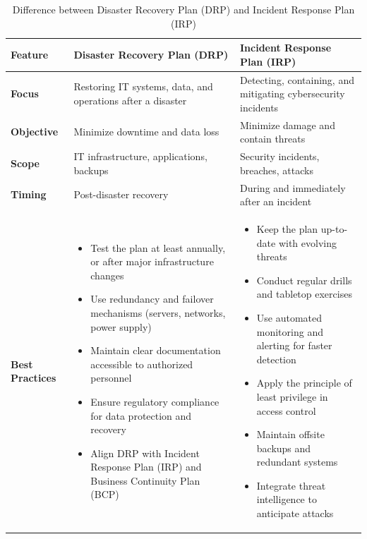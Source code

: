 \begin{table}[h!]
\centering
\renewcommand{\arraystretch}{1.35}
\begin{tabular}{|p{3cm}|p{6.2cm}|p{6.2cm}|}
\hline
\textbf{Feature} & \textbf{Disaster Recovery Plan (DRP)} & \textbf{Incident Response Plan (IRP)} \\
\hline

\textbf{Focus} & Restoring IT systems, data, and operations after a disaster &
Detecting, containing, and mitigating cybersecurity incidents \\
\hline

\textbf{Objective} & Minimize downtime and data loss &
Minimize damage and contain threats \\
\hline

\textbf{Scope} & IT infrastructure, applications, backups &
Security incidents, breaches, attacks \\
\hline

\textbf{Timing} & Post-disaster recovery &
During and immediately after an incident \\
\hline

\textbf{Best Practices} &
\begin{itemize}
    \item Test the plan at least annually, or after major infrastructure changes
    \item Use redundancy and failover mechanisms (servers, networks, power supply)
    \item Maintain clear documentation accessible to authorized personnel
    \item Ensure regulatory compliance for data protection and recovery
    \item Align DRP with Incident Response Plan (IRP) and Business Continuity Plan (BCP)
\end{itemize}
&
\begin{itemize}
    \item Keep the plan up-to-date with evolving threats
    \item Conduct regular drills and tabletop exercises
    \item Use automated monitoring and alerting for faster detection
    \item Apply the principle of least privilege in access control
    \item Maintain offsite backups and redundant systems
    \item Integrate threat intelligence to anticipate attacks
\end{itemize}
\\
\hline

\end{tabular}
\caption{Difference between Disaster Recovery Plan (DRP) and Incident Response Plan (IRP)}
\end{table}

